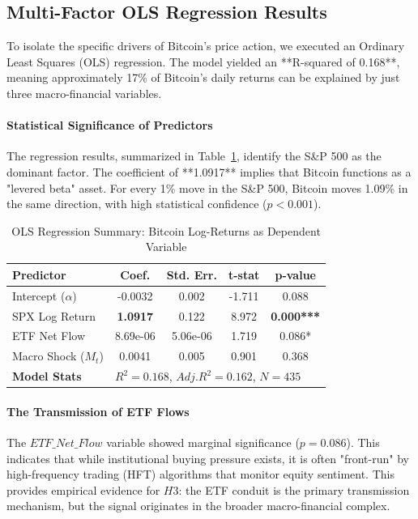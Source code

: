 \documentclass[10pt, conference, compsocconf]{IEEEtran}
\begin{document}
\subsection{Multi-Factor OLS Regression Results}

To isolate the specific drivers of Bitcoin’s price action, we executed an Ordinary Least Squares (OLS) regression. The model yielded an **R-squared of 0.168**, meaning approximately 17\% of Bitcoin’s daily returns can be explained by just three macro-financial variables.

\paragraph{Statistical Significance of Predictors}
The regression results, summarized in Table~\ref{tab:ols_results}, identify the S\&P 500 as the dominant factor. The coefficient of **1.0917** implies that Bitcoin functions as a "levered beta" asset. For every 1\% move in the S\&P 500, Bitcoin moves 1.09\% in the same direction, with high statistical confidence ($p < 0.001$).

\begin{table}[htbp]
\caption{OLS Regression Summary: Bitcoin Log-Returns as Dependent Variable}
\centering
\small
\renewcommand{\arraystretch}{1.2}
\begin{tabularx}{\linewidth}{lcccc}
\toprule
\textbf{Predictor} & \textbf{Coef.} & \textbf{Std. Err.} & \textbf{t-stat} & \textbf{p-value} \\
\midrule
Intercept ($\alpha$) & -0.0032 & 0.002 & -1.711 & 0.088 \\
SPX Log Return & \textbf{1.0917} & 0.122 & 8.972 & \textbf{0.000***} \\
ETF Net Flow & 8.69e-06 & 5.06e-06 & 1.719 & 0.086* \\
Macro Shock ($M_t$) & 0.0041 & 0.005 & 0.901 & 0.368 \\
\midrule
\textbf{Model Stats} & \multicolumn{4}{l}{$R^2 = 0.168$, $Adj. R^2 = 0.162$, $N = 435$} \\
\bottomrule
\end{tabularx}
\label{tab:ols_results}
\end{table}

\paragraph{The Transmission of ETF Flows}
The $ETF\_Net\_Flow$ variable showed marginal significance ($p = 0.086$). This indicates that while institutional buying pressure exists, it is often "front-run" by high-frequency trading (HFT) algorithms that monitor equity sentiment. This provides empirical evidence for $H3$: the ETF conduit is the primary transmission mechanism, but the signal originates in the broader macro-financial complex.
\end{document}
